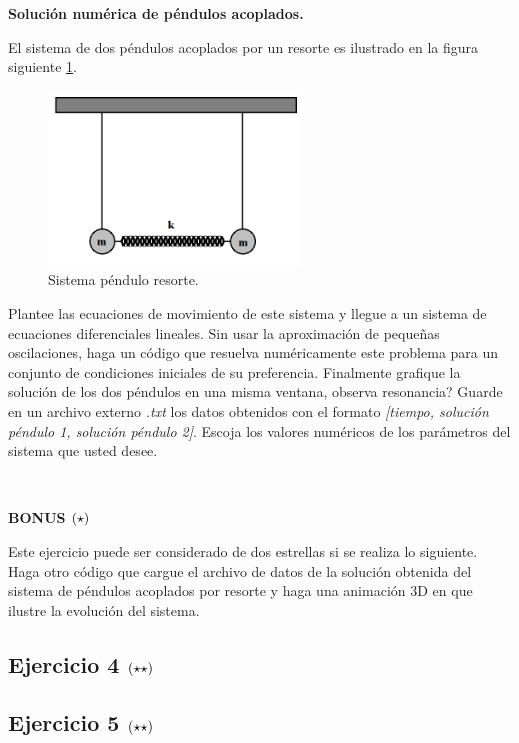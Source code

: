 \textbf{Solución numérica de péndulos acoplados.}

El sistema de dos péndulos acoplados por un resorte es ilustrado en la figura
siguiente \ref{fig:spring_acopled_pendulums}.


\begin{figure}[htbp]
	\centering
	\includegraphics[width=0.60\textwidth]
	{./pictures/acopled_pendulum_spring.png}

	\caption{\small{Sistema péndulo resorte.}}
	
	\label{fig:spring_acopled_pendulums}
\end{figure}

Plantee las ecuaciones de movimiento de este sistema y llegue a un sistema 
de ecuaciones diferenciales lineales. Sin usar la aproximación de pequeñas 
oscilaciones, haga un código que resuelva numéricamente este problema para 
un conjunto de condiciones iniciales de su preferencia. Finalmente grafique 
la solución de los dos péndulos en una misma ventana, observa resonancia?
Guarde en un archivo externo \textit{.txt} los datos obtenidos con el formato 
\textit{[tiempo, solución péndulo 1, solución péndulo 2]}.
Escoja los valores numéricos de los parámetros del sistema que usted desee.

\

\textbf{BONUS \large{$\left( \star \right)$}}

Este ejercicio puede ser considerado de dos estrellas si se realiza lo siguiente.
Haga otro código que cargue el archivo de datos de la solución obtenida del 
sistema de péndulos acoplados por resorte y haga una animación 3D en \mayavi que 
ilustre la evolución del sistema.


\subsection*{Ejercicio 4 \large{$\left( \star \star \right)$}}

\subsection*{Ejercicio 5 \large{$\left( \star \star \right)$}}


